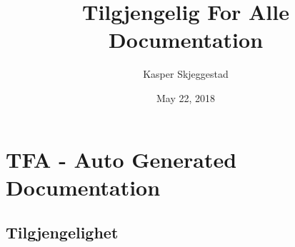 \documentclass[letterpaper,10pt,english]{sphinxmanual}
\title{Tilgjengelig For Alle Documentation}
\date{May 22, 2018}
\author{Kasper Skjeggestad}
\begin{document}
\maketitle
\sphinxtableofcontents
{}\label{\detokenize{index::doc}}



\chapter{TFA - Auto Generated Documentation}
\label{\detokenize{code:welcome-to-tilgjengelig-for-alle-s-documentation}}\label{\detokenize{code::doc}}\label{\detokenize{code:tfa-auto-generated-documentation}}

\section{Tilgjengelighet}
\end{document}
